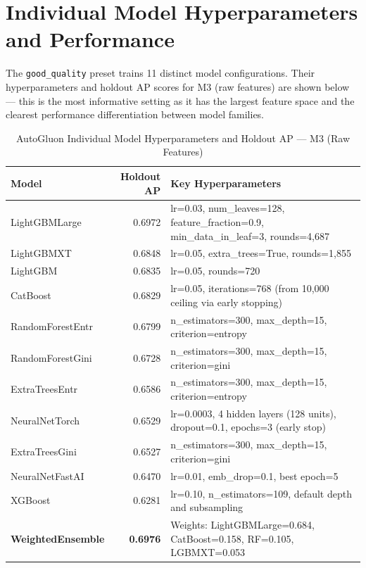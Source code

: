 \documentclass{report}\usepackage[]{graphicx}\usepackage[table]{xcolor}
\begin{document}
\section{Individual Model Hyperparameters and Performance}

The \texttt{good\_quality} preset trains 11 distinct model configurations.
Their hyperparameters and holdout AP scores for M3 (raw features) are shown below —
this is the most informative setting as it has the largest feature space and 
the clearest performance differentiation between model families.

\begin{table}[H]
\centering
\caption{AutoGluon Individual Model Hyperparameters and Holdout AP — M3 (Raw Features)}
\small
\begin{tabular}{lrp{8.5cm}}
\toprule
\textbf{Model} & \textbf{Holdout AP} & \textbf{Key Hyperparameters} \\
\midrule
LightGBMLarge    & 0.6972 & lr=0.03, num\_leaves=128, feature\_fraction=0.9, min\_data\_in\_leaf=3, rounds=4,687 \\
LightGBMXT       & 0.6848 & lr=0.05, extra\_trees=True, rounds=1,855 \\
LightGBM         & 0.6835 & lr=0.05, rounds=720 \\
CatBoost         & 0.6829 & lr=0.05, iterations=768 (from 10,000 ceiling via early stopping) \\
RandomForestEntr & 0.6799 & n\_estimators=300, max\_depth=15, criterion=entropy \\
RandomForestGini & 0.6728 & n\_estimators=300, max\_depth=15, criterion=gini \\
ExtraTreesEntr   & 0.6586 & n\_estimators=300, max\_depth=15, criterion=entropy \\
NeuralNetTorch   & 0.6529 & lr=0.0003, 4 hidden layers (128 units), dropout=0.1, epochs=3 (early stop) \\
ExtraTreesGini   & 0.6527 & n\_estimators=300, max\_depth=15, criterion=gini \\
NeuralNetFastAI  & 0.6470 & lr=0.01, emb\_drop=0.1, best epoch=5 \\
XGBoost          & 0.6281 & lr=0.10, n\_estimators=109, default depth and subsampling \\
\midrule
\textbf{WeightedEnsemble} & \textbf{0.6976} & Weights: LightGBMLarge=0.684, CatBoost=0.158, RF=0.105, LGBMXT=0.053 \\
\bottomrule
\end{tabular}
\end{table}
\end{document}
